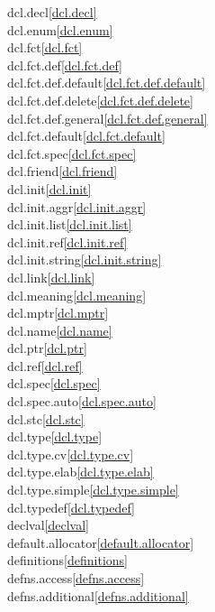 \begin{multicols}{2}
dcl.decl\quad\ref{dcl.decl}\\
dcl.enum\quad\ref{dcl.enum}\\
dcl.fct\quad\ref{dcl.fct}\\
dcl.fct.def\quad\ref{dcl.fct.def}\\
dcl.fct.def.default\quad\ref{dcl.fct.def.default}\\
dcl.fct.def.delete\quad\ref{dcl.fct.def.delete}\\
dcl.fct.def.general\quad\ref{dcl.fct.def.general}\\
dcl.fct.default\quad\ref{dcl.fct.default}\\
dcl.fct.spec\quad\ref{dcl.fct.spec}\\
dcl.friend\quad\ref{dcl.friend}\\
dcl.init\quad\ref{dcl.init}\\
dcl.init.aggr\quad\ref{dcl.init.aggr}\\
dcl.init.list\quad\ref{dcl.init.list}\\
dcl.init.ref\quad\ref{dcl.init.ref}\\
dcl.init.string\quad\ref{dcl.init.string}\\
dcl.link\quad\ref{dcl.link}\\
dcl.meaning\quad\ref{dcl.meaning}\\
dcl.mptr\quad\ref{dcl.mptr}\\
dcl.name\quad\ref{dcl.name}\\
dcl.ptr\quad\ref{dcl.ptr}\\
dcl.ref\quad\ref{dcl.ref}\\
dcl.spec\quad\ref{dcl.spec}\\
dcl.spec.auto\quad\ref{dcl.spec.auto}\\
dcl.stc\quad\ref{dcl.stc}\\
dcl.type\quad\ref{dcl.type}\\
dcl.type.cv\quad\ref{dcl.type.cv}\\
dcl.type.elab\quad\ref{dcl.type.elab}\\
dcl.type.simple\quad\ref{dcl.type.simple}\\
dcl.typedef\quad\ref{dcl.typedef}\\
declval\quad\ref{declval}\\
default.allocator\quad\ref{default.allocator}\\
definitions\quad\ref{definitions}\\
defns.access\quad\ref{defns.access}\\
defns.additional\quad\ref{defns.additional}\\

\end{multicols}
